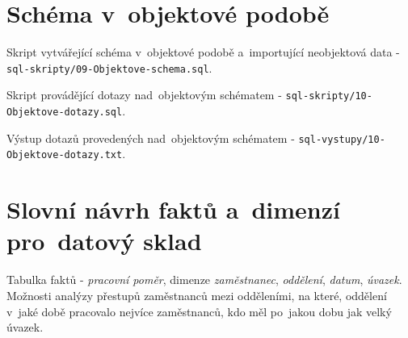 \documentclass[a4paper,10pt]{article}
\begin{document}

\section{Schéma v~objektové podobě}

\par Skript vytvářející schéma v~objektové
podobě a~importující neobjektová data - \texttt{sql-skripty/09-Objektove-schema.sql}.

\par Skript provádějící dotazy nad~objektovým
schématem - \texttt{sql-skripty/10-Objektove-dotazy.sql}.

\par Výstup dotazů provedených nad~objektovým
schématem - \texttt{sql-vystupy/10-Objektove-dotazy.txt}.


\section{Slovní návrh faktů a~dimenzí pro~datový sklad}

\par Tabulka faktů - \emph{pracovní poměr}, dimenze \emph{zaměstnanec}, \emph{oddělení},
\emph{datum}, \emph{úvazek}. Možnosti analýzy přestupů zaměstnanců mezi odděleními,
na které, oddělení v~jaké době pracovalo nejvíce zaměstnanců, kdo měl po~jakou dobu jak
velký úvazek.\\

\end{document}
